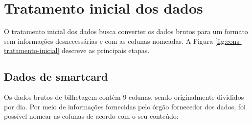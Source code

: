 \documentclass[        
    a4paper,          %
    12pt,             %
    chapter=TITLE,    %
    section=Title,    %
    subsection=Title, %
    oneside,          %
    english,          %
    spanish,          %
    brazil,           %
    fleqn             %
]{abntex2}
\begin{document}
  \hypertarget{tratamento-inicial-dos-dados}{%
  \section{Tratamento inicial dos dados}\label{tratamento-inicial-dos-dados}}
  
  O tratamento inicial dos dados busca converter os dados brutos para um formato sem informações desnecessárias e com as colunas nomeadas. A Figura \ref{fig:cons-tratamento-inicial} descreve as principais etapas.
  
  \begin{figure}[!h]
  \captionsetup{width=16cm}
  \centering
  \end{figure}
  
  \hypertarget{dados-de-smartcard}{%
  \subsection{Dados de smartcard}\label{dados-de-smartcard}}
  
  Os dados brutos de bilhetagem contém 9 colunas, sendo originalmente divididos por dia. Por meio de informações fornecidas pelo órgão fornecedor dos dados, foi possível nomear as colunas de acordo com o seu conteúdo:
  
\end{document}
